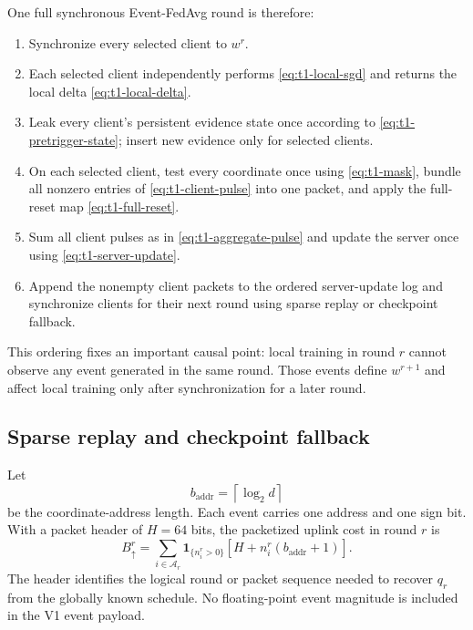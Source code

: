 One full synchronous Event-FedAvg round is therefore:
\begin{enumerate}[label=\textbf{T1.\arabic*}]
    \item Synchronize every selected client to $w^r$.
    \item Each selected client independently performs \eqref{eq:t1-local-sgd} and returns the local delta \eqref{eq:t1-local-delta}.
    \item Leak every client's persistent evidence state once according to \eqref{eq:t1-pretrigger-state}; insert new evidence only for selected clients.
    \item On each selected client, test every coordinate once using \eqref{eq:t1-mask}, bundle all nonzero entries of \eqref{eq:t1-client-pulse} into one packet, and apply the full-reset map \eqref{eq:t1-full-reset}.
    \item Sum all client pulses as in \eqref{eq:t1-aggregate-pulse} and update the server once using \eqref{eq:t1-server-update}.
    \item Append the nonempty client packets to the ordered server-update log and synchronize clients for their next round using sparse replay or checkpoint fallback.
\end{enumerate}

This ordering fixes an important causal point: local training in round $r$ cannot observe any event generated in the same round. Those events define $w^{r+1}$ and affect local training only after synchronization for a later round.

\subsection{Sparse replay and checkpoint fallback}

Let
\begin{equation}
    b_{\mathrm{addr}}=\left\lceil\log_2 d\right\rceil
\end{equation}
be the coordinate-address length. Each event carries one address and one sign bit. With a packet header of $H=64$ bits, the packetized uplink cost in round $r$ is
\begin{equation}
    B_{\uparrow}^r
    =
    \sum_{i\in\mathcal{A}_r}
    \mathbf{1}_{\{n_i^r>0\}}
    \left[
        H+n_i^r(b_{\mathrm{addr}}+1)
    \right].
    \label{eq:t1-uplink-bits}
\end{equation}
The header identifies the logical round or packet sequence needed to recover $q_r$ from the globally known schedule. No floating-point event magnitude is included in the V1 event payload.

